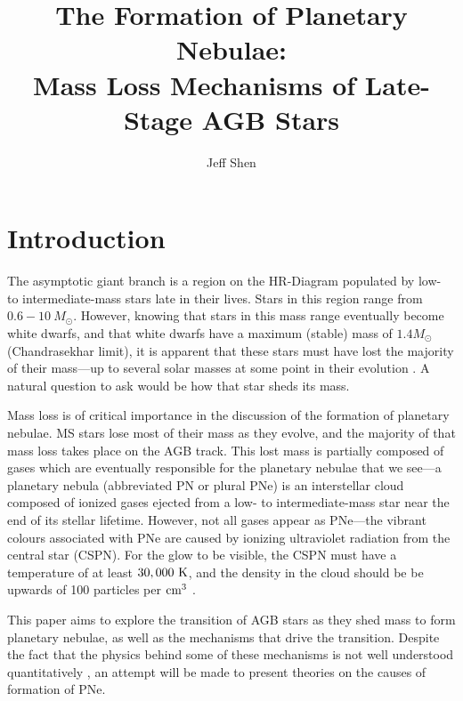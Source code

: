 \documentclass[twocolumn]{aastex63}
\begin{document}
\author{Jeff Shen}
\title{The Formation of Planetary Nebulae: \\
Mass Loss Mechanisms of Late-Stage AGB Stars} 


\section{Introduction} \label{sec:intro}

The asymptotic giant branch is a region on the HR-Diagram populated by low- to intermediate-mass stars late in their lives. Stars in this region range from $0.6-10~M_\odot$. However, knowing that stars in this mass range eventually become white dwarfs, and that white dwarfs have a maximum (stable) mass of $1.4 M_\odot$ (Chandrasekhar limit), it is apparent that these stars must have lost the majority of their mass—up to several solar masses at some point in their evolution \cite{willson}. A natural question to ask would be how that star sheds its mass. 

Mass loss is of critical importance in the discussion of the formation of planetary nebulae. MS stars lose most of their mass as they evolve, and the majority of that mass loss takes place on the AGB track. This lost mass is partially composed of gases which are eventually responsible for the planetary nebulae that we see—a planetary nebula (abbreviated PN or plural PNe) is an interstellar cloud composed of ionized gases ejected from a low- to intermediate-mass star near the end of its stellar lifetime. However, not all gases appear as PNe—the vibrant colours associated with PNe are caused by ionizing ultraviolet radiation from the central star (CSPN). For the glow to be visible, the CSPN must have a temperature of at least $30,000~{\rm K}$, and the density in the cloud should be be upwards of 100 particles per ${\rm cm^{3}}$ \citep{prialnik}.

This paper aims to explore the transition of AGB stars as they shed mass to form planetary nebulae, as well as the mechanisms that drive the transition. Despite the fact that the physics behind some of these mechanisms is not well understood quantitatively \citep{blocker}, an attempt will be made to present theories on the causes of formation of PNe.

\vfill \null
\columnbreak
\end{document}
